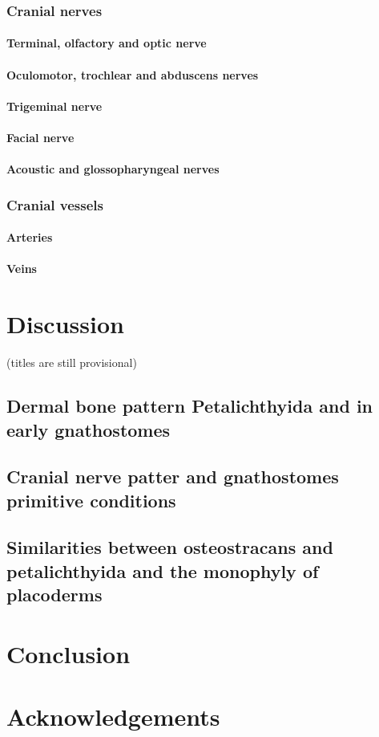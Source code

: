 \documentclass[12pt,letterpaper]{article}
\begin{document}
\subsubsection{Cranial nerves}
\paragraph{Terminal, olfactory and optic nerve}

\paragraph{Oculomotor, trochlear and abduscens nerves}
\paragraph{Trigeminal nerve}
\paragraph{Facial nerve}
\paragraph{Acoustic and glossopharyngeal nerves}

\subsubsection{Cranial vessels}
\paragraph{Arteries}
\paragraph{Veins}

\section{Discussion}
(titles are still provisional)
\subsection{Dermal bone pattern Petalichthyida and in early gnathostomes}

\subsection{Cranial nerve patter and gnathostomes primitive conditions}


\subsection{Similarities between osteostracans and petalichthyida and the monophyly of placoderms}

\section{Conclusion}

\section{Acknowledgements}



\end{document}
